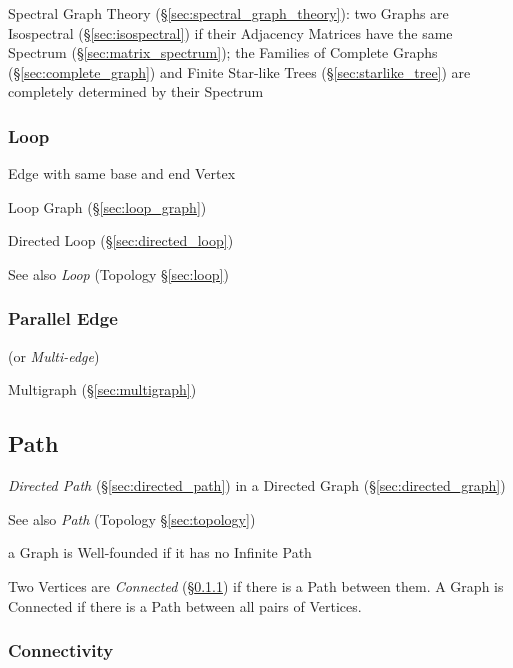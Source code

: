 Spectral Graph Theory (\S\ref{sec:spectral_graph_theory}): two Graphs are
Isospectral (\S\ref{sec:isospectral}) if their Adjacency Matrices have the same
Spectrum (\S\ref{sec:matrix_spectrum}); the Families of Complete Graphs
(\S\ref{sec:complete_graph}) and Finite Star-like Trees
(\S\ref{sec:starlike_tree}) are completely determined by their Spectrum



\subsubsection{Loop}\label{sec:graph_loop}

Edge with same base and end Vertex

Loop Graph (\S\ref{sec:loop_graph})

Directed Loop (\S\ref{sec:directed_loop})

\fist See also \emph{Loop} (Topology \S\ref{sec:loop})



\subsubsection{Parallel Edge}\label{sec:parallel_edge}

(or \emph{Multi-edge})

Multigraph (\S\ref{sec:multigraph})



\subsection{Path}\label{sec:graph_path}

\emph{Directed Path} (\S\ref{sec:directed_path}) in a Directed Graph
(\S\ref{sec:directed_graph})

\fist See also \emph{Path} (Topology \S\ref{sec:topology})

a Graph is Well-founded if it has no Infinite Path

Two Vertices are \emph{Connected} (\S\ref{sec:connectivity}) if there
is a Path between them. A Graph is Connected if there is a Path
between all pairs of Vertices.



\subsubsection{Connectivity}\label{sec:connectivity}

